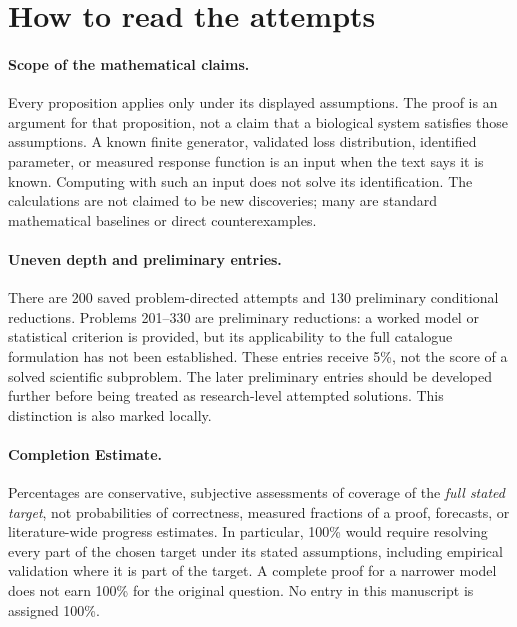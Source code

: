 \documentclass[11pt]{article}
\begin{document}
\begin{abstract}
This manuscript gives an attempted answer for each of the 330 supplied catalogue
entries. It preserves the original numbering and states the target beside the
attempt, distinguishing a theorem about a specified model from resolution of a
biological research target. The results consist of worked special cases,
identifiability obstructions, quantitative bounds, and explicitly preliminary
reductions. None is claimed to resolve its complete catalogue target. No new
biological experiments, empirical data analyses, or external proof verification
were performed for this manuscript.
\end{abstract}

\section*{How to read the attempts}
\paragraph{Scope of the mathematical claims.}
Every proposition applies only under its displayed assumptions. The proof is an
argument for that proposition, not a claim that a biological system satisfies
those assumptions. A known finite generator, validated loss distribution,
identified parameter, or measured response function is an input when the text
says it is known. Computing with such an input does not solve its identification.
The calculations are not claimed to be new discoveries; many are standard
mathematical baselines or direct counterexamples.

\paragraph{Uneven depth and preliminary entries.}
There are 200 saved problem-directed attempts and 130 preliminary conditional reductions. Problems 201--330 are preliminary reductions: a worked model or statistical criterion is provided, but its applicability to the full catalogue formulation has not been established. These entries receive 5\%, not the score of a solved scientific subproblem. 
The later preliminary entries should be developed further before being treated
as research-level attempted solutions. This distinction is also marked locally.

\paragraph{Completion Estimate.}
Percentages are conservative, subjective assessments of coverage of the
\emph{full stated target}, not probabilities of correctness, measured fractions
of a proof, forecasts, or literature-wide progress estimates. In particular,
100\% would require resolving every part of the chosen target under its stated
assumptions, including empirical validation where it is part of the target.
A complete proof for a narrower model does not earn 100\% for the original
question. No entry in this manuscript is assigned 100\%.
\end{document}
